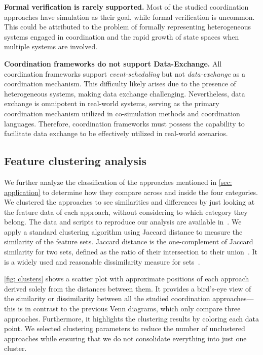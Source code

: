 \documentclass[runningheads]{llncs}
\begin{document}
\textbf{Formal verification is rarely supported.}
Most of the studied coordination approaches have simulation as their goal, while formal verification is uncommon.
This could be attributed to the problem of formally representing heterogeneous systems engaged in coordination and the rapid growth of state spaces when multiple systems are involved.

\textbf{Coordination frameworks do not support Data-Exchange.}
All coordination frameworks %
support \textit{event-scheduling} but not \textit{data-exchange} as a coordination mechanism.
This difficulty likely arises due to the presence of heterogeneous systems, making data exchange challenging.
Nevertheless, data exchange is omnipotent in real-world systems, serving as the primary coordination mechanism utilized in co-simulation methods and coordination languages.
Therefore, coordination frameworks must possess the capability to facilitate data exchange to be effectively utilized in real-world scenarios.

\subsection{Feature clustering analysis}

We further analyze the classification of the approaches mentioned in \autoref{sec: application} to determine how they compare across and inside the four categories.
We clustered the approaches to see similarities and differences by just looking at the feature data of each approach, without considering to which category they belong.
The data and scripts to reproduce our analysis are available in~\cite{timkrauterArtifactsCoordination2024}.
We apply a standard clustering algorithm using Jaccard distance to measure the similarity of the feature sets.
Jaccard distance is the one-complement of Jaccard similarity for two sets, defined as the ratio of their intersection to their union~\cite{levandowskyDistanceSets1971}.
It is a widely used and reasonable dissimilarity measure for sets~\cite{levandowskyDistanceSets1971}.

\autoref{fig: clusters} shows a scatter plot with approximate positions of each approach derived solely from the distances between them.
It provides a bird's-eye view of the similarity or dissimilarity between all the studied coordination approaches---this is in contrast to the previous Venn diagrams, which only compare three approaches.
Furthermore, it highlights the clustering results by coloring each data point.
We selected clustering parameters to reduce the number of unclustered approaches while ensuring that we do not consolidate everything into just one cluster.
\end{document}
